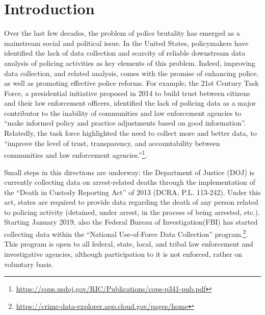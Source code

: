 

\section{Introduction} \label{sec:intro}



Over the last few decades, the problem of police brutality has emerged as a mainstream social and political issue. In the United States,  policymakers have identified the lack of data collection and scarcity of reliable downstream data analysis of policing activities as key elements of this problem. Indeed, improving data collection, and related analysis, comes with the promise of enhancing police, as well as promoting effective police reforms. For example, the 21st Century Task Force, a presidential initiative proposed in 2014 to build trust between citizens and their law enforcement officers, identified the lack of policing data as a major contributor to the inability of communities and law enforcement agencies to ``make informed policy and practice adjustments based on good information''. Relatedly, the task force highlighted the need to collect more and better data, to ``improve the level of trust, transparency, and accountability between communities and law enforcement agencies.''\footnote{\url{https://cops.usdoj.gov/RIC/Publications/cops-p341-pub.pdf}}. 

Small steps in this directions are underway: the Department of Justice (DOJ) is currently collecting data on arrest-related deaths through the implementation of the ``Death in Custody Reporting Act'' of 2013 (DCRA, P.L. 113-242). Under this act, states are required to provide data regarding the death of any person related to policing activity (detained, under arrest, in the process of being arrested, etc.). Starting January 2019, also the Federal Bureau of Investigation(FBI) has started collecting data within the ``National Use-of-Force Data Collection'' program.\footnote{\url{https://crime-data-explorer.app.cloud.gov/pages/home}}. This program is open to all federal, state, local, and tribal law enforcement and investigative agencies, although participation to it is not enforced, rather on voluntary basis. 

